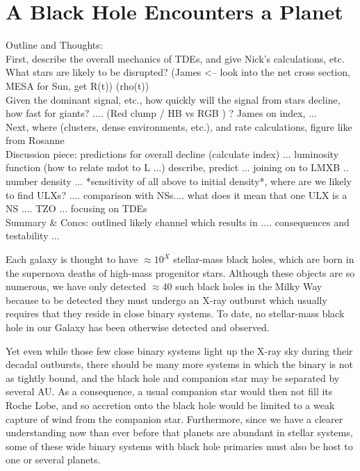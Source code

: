 \section{A Black Hole Encounters a Planet}\label{section:general}

Outline and Thoughts:\\
First, describe the overall mechanics of TDEs, and give Nick's calculations, etc. \\
What stars are likely to be disrupted?  (James <-- look into the net cross section, MESA for Sun, get R(t)) (rho(t)) \\
Given the dominant signal, etc., how quickly will the signal from stars decline, how fast for giants? .... (Red clump / HB vs RGB ) ?  James on index, ... \\ 
Next, where (clusters, dense environments, etc.), and rate calculations, figure like from Rosanne \\
Discussion piece: predictions for overall decline (calculate index) ... luminosity function (how to relate mdot to L ...) describe, predict  ... joining on to LMXB .. number density ... *sensitivity of all above to initial density*,  where are we likely to find ULXs? .... comparison with NSs.... what does it mean that one ULX is a NS .... TZO ... focusing on TDEs \\
Summary & Concs: outlined likely channel which results in .... consequences and testability ... 







Each galaxy is thought to have $\approx 10^X$ stellar-mass black
holes, which are born in the supernova deaths of high-mass progenitor
stars.  Although these objects are so numerous, we have only detected
$\approx$40 such black holes in the Milky Way because to be detected
they must undergo an X-ray outburst which usually requires that they
reside in close binary systems.  To date, no stellar-mass black hole
in our Galaxy has been otherwise detected and observed.


Yet even while those few close binary systems light up the X-ray sky
during their decadal outbursts, there should be many more systems in
which the binary is not as tightly bound, and the black hole and
companion star may be separated by several AU.  As a consequence, a
usual companion star would then not fill its Roche Lobe, and so
accretion onto the black hole would be limited to a weak capture of
wind from the companion star.  Furthermore, since we have a clearer
understanding now than ever before that planets are abundant in
stellar systems, some of these wide binary systems with black hole
primaries must also be host to one or several planets.  


